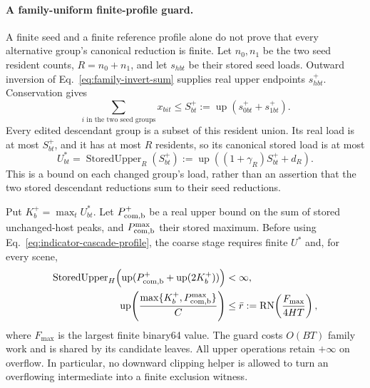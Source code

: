 \documentclass[11pt]{article}
\newcommand{\up}{\operatorname{up}}
\begin{document}
\paragraph{A family-uniform finite-profile guard.}
A finite seed and a finite reference profile alone do not prove that every alternative group's canonical reduction is finite. Let $n_0,n_1$ be the two seed resident counts, $R=n_0+n_1$, and let $s_{hbt}$ be their stored seed loads. Outward inversion of Eq.~\eqref{eq:family-invert-sum} supplies real upper endpoints $s^+_{hbt}$. Conservation gives
\begin{equation}
\sum_{i\text{ in the two seed groups}}x_{bit}\le
S^+_{bt}:=\up(s^+_{0bt}+s^+_{1bt}).
\end{equation}
Every edited descendant group is a subset of this resident union. Its real load is at most $S^+_{bt}$, and it has at most $R$ residents, so its canonical stored load is at most
\begin{equation}
U^*_{bt}=\operatorname{StoredUpper}_R(S^+_{bt})
:=\up\!\left((1+\gamma_R)S^+_{bt}+d_R\right).
\label{eq:cascade-uniform-load-upper}
\end{equation}
This is a bound on each changed group's load, rather than an assertion that the two stored descendant reductions sum to their seed reductions.

Put $K_b^+=\max_tU^*_{bt}$. Let $P_{\rm com,b}^+$ be a real upper bound on the sum of stored unchanged-host peaks, and $P_{\rm com,b}^{\max}$ their stored maximum. Before using Eq.~\eqref{eq:indicator-cascade-profile}, the coarse stage requires finite $U^*$ and, for every scene,
\begin{align}
\operatorname{StoredUpper}_H\!\left(\up(P_{\rm com,b}^++\up(2K_b^+))\right)&<\infty,\nonumber\\
\up\!\left(\frac{\max\{K_b^+,P_{\rm com,b}^{\max}\}}{C}\right)
&\le\bar r:=\operatorname{RN}\!\left(\frac{F_{\max}}{4HT}\right),
\label{eq:cascade-uniform-range-guard}
\end{align}
where $F_{\max}$ is the largest finite binary64 value. The guard costs $O(BT)$ family work and is shared by its candidate leaves. All upper operations retain $+\infty$ on overflow. In particular, no downward clipping helper is allowed to turn an overflowing intermediate into a finite exclusion witness.
\end{document}
